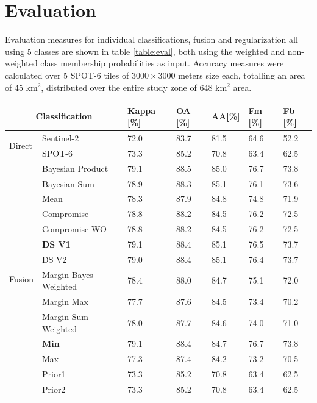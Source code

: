 \documentclass[10pt]{article}
\begin{document}
\section{Evaluation}
Evaluation measures for individual classifications, fusion and regularization all using 5 classes are shown in table \ref{table:eval}, both using the weighted and non-weighted class membership probabilities as input. Accuracy measures were calculated over 5 SPOT-6 tiles of $3000\times3000$ meters size each, totalling an area of 45 km$^2$, distributed over the entire study zone of 648 km$^2$ area.
\begin{table}[H]
\centering
\begin{tabular}{p{1.8cm}llllll}\toprule
\multicolumn{2}{c}{\textbf{Classification}}& \textbf{Kappa} [\%] & \textbf{OA} [\%] & \textbf{AA}[\%] & \textbf{Fm} [\%] & \textbf{Fb} [\%]\\\hline
\multirow{2}{*}{Direct}& Sentinel-2 & 72.0 & 83.7 & 81.5 & 64.6 & 52.2 \\
& SPOT-6 & 73.3 & 85.2 & 70.8 & 63.4 & 62.5 \\\hline

\multirow{14}{*}{Fusion}& Bayesian Product & 79.1 & 88.5 & 85.0 & 76.7 & 73.8 \\
& Bayesian Sum & 78.9 & 88.3 & 85.1 & 76.1 & 73.6 \\
& Mean  & 78.3 & 87.9 & 84.8 & 74.8 & 71.9 \\

& Compromise & 78.8 & 88.2 & 84.5 & 76.2 & 72.5 \\
& Compromise WO & 78.8 & 88.2 & 84.5 & 76.2 & 72.5 \\

& \textbf{DS V1} & 79.1 & 88.4 & 85.1 & 76.5 & 73.7 \\
& DS V2 & 79.0 & 88.4 & 85.1 & 76.4 & 73.7 \\
& Margin Bayes Weighted  & 78.4 & 88.0 & 84.7 & 75.1 & 72.0 \\
& Margin Max & 77.7 & 87.6 & 84.5 & 73.4 & 70.2 \\
& Margin Sum Weighted & 78.0 & 87.7 & 84.6 & 74.0 & 71.0 \\
& \textbf{Min} & 79.1 & 88.4 & 84.7 & 76.7 & 73.8 \\
& Max & 77.3 & 87.4 & 84.2 & 73.2 & 70.5 \\


& Prior1 & 73.3 & 85.2 & 70.8 & 63.4 & 62.5 \\
& Prior2 & 73.3 & 85.2 & 70.8 & 63.4 & 62.5 \\\hline


\end{tabular}
\end{table}
\end{document}
